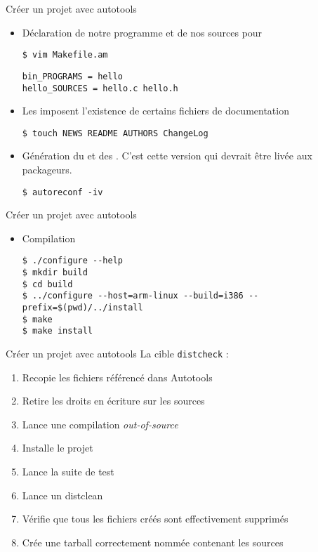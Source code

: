\begin{frame}[fragile=singleslide]{Créer un projet avec autotools}
  \begin{itemize}
  \item Déclaration de notre programme et de nos sources pour 
\begin{lstlisting}
$ vim Makefile.am
\end{lstlisting} %
\begin{lstlisting}
bin_PROGRAMS = hello
hello_SOURCES = hello.c hello.h
\end{lstlisting}
  \item Les   imposent l'existence de certains fichiers
    de documentation
\begin{lstlisting}
$ touch NEWS README AUTHORS ChangeLog
\end{lstlisting} %
  \item      Génération      du            et      des
    . C'est cette version qui devrait être livée aux
    packageurs.
\begin{lstlisting}
$ autoreconf -iv
\end{lstlisting} %
  \end{itemize}
\end{frame}

\begin{frame}[fragile=singleslide]{Créer un projet avec autotools}
  \begin{itemize}
  \item Compilation
\begin{lstlisting}
$ ./configure --help
$ mkdir build
$ cd build
$ ../configure --host=arm-linux --build=i386 --prefix=$(pwd)/../install
$ make
$ make install
\end{lstlisting} %
  \end{itemize}
\end{frame}

\begin{frame}[fragile=singleslide]{Créer un projet avec autotools}
  La cible \verb+distcheck+ :
  \begin{enumerate}
  \item Recopie les fichiers référencé dans Autotools
  \item Retire les droits en écriture sur les sources
  \item Lance une compilation \emph{out-of-source}
  \item Installe le projet
  \item Lance la suite de test
  \item Lance un distclean
  \item Vérifie que tous les fichiers créés sont effectivement supprimés
  \item Crée une tarball correctement nommée contenant les sources
  \end{enumerate}
\end{frame}

